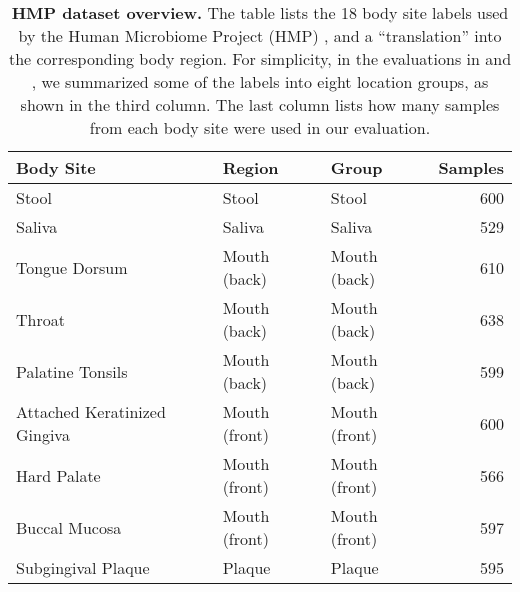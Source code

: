 \begin{table}[htbp]
\caption[HMP dataset overview]{
\textbf{HMP dataset overview.}
The table lists the \num{18} body site labels used by the Human Microbiome Project (HMP) \cite{Huttenhower2012,Methe2012},
and a ``translation'' into the corresponding body region.
For simplicity, in the evaluations in  and
,
we summarized some of the labels into eight location groups, as shown in the third column.
The last column lists how many samples from each body site were used in our evaluation.
}
\label{tab:hmp_data_overview}
{
    \begin{center}
    \begin{tabular}{lllr}
        \toprule
        Body Site                       & Region            & Group             & Samples   \\
        \midrule
        Stool                           & Stool             & Stool             & 600   \\
        Saliva                          & Saliva            & Saliva            & 529   \\
        Tongue Dorsum                   & Mouth (back)      & Mouth (back)      & 610   \\
        Throat                          & Mouth (back)      & Mouth (back)      & 638   \\
        Palatine Tonsils                & Mouth (back)      & Mouth (back)      & 599   \\
        Attached Keratinized Gingiva    & Mouth (front)     & Mouth (front)     & 600   \\
        Hard Palate                     & Mouth (front)     & Mouth (front)     & 566   \\
        Buccal Mucosa                   & Mouth (front)     & Mouth (front)     & 597   \\
        Subgingival Plaque              & Plaque            & Plaque            & 595   \\

\end{tabular}
\end{center}}
\end{table}
